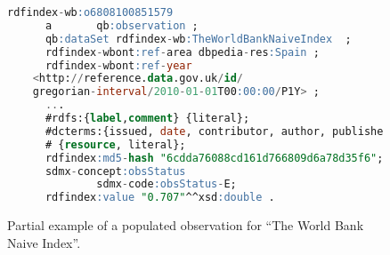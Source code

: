 \begin{figure}[!ht]
\begin{lstlisting}[language=SQL,basicstyle=\scriptsize]  
rdfindex-wb:o6808100851579
      a       qb:observation ;
      qb:dataSet rdfindex-wb:TheWorldBankNaiveIndex  ;
      rdfindex-wbont:ref-area dbpedia-res:Spain ;
      rdfindex-wbont:ref-year
	<http://reference.data.gov.uk/id/
	gregorian-interval/2010-01-01T00:00:00/P1Y> ;
      ...
      #rdfs:{label,comment} {literal};
      #dcterms:{issued, date, contributor, author, publisher, identifier} 
      #	{resource, literal};
      rdfindex:md5-hash "6cdda76088cd161d766809d6a78d35f6";
      sdmx-concept:obsStatus
              sdmx-code:obsStatus-E;
      rdfindex:value "0.707"^^xsd:double .
\end{lstlisting}
\caption{Partial example of a populated observation for ``The World Bank Naive Index''.}
 \label{fig:generated observation}
\end{figure}


